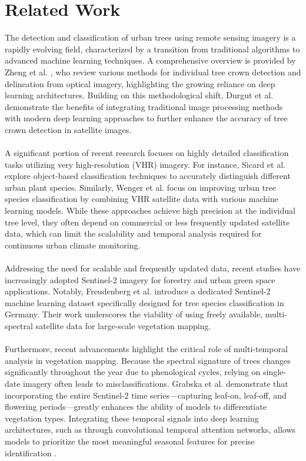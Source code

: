 \section{Related Work}

The detection and classification of urban trees using remote sensing imagery is a rapidly evolving field, characterized by a transition from traditional algorithms to advanced machine learning techniques. A comprehensive overview is provided by Zheng et al. \cite{zheng2023reviewindividualtreecrown}, who review various methods for individual tree crown detection and delineation from optical imagery, highlighting the growing reliance on deep learning architectures. Building on this methodological shift, Durgut et al. \cite{durgut2025integrating} demonstrate the benefits of integrating traditional image processing methods with modern deep learning approaches to further enhance the accuracy of tree crown detection in satellite images. \\
\\
A significant portion of recent research focuses on highly detailed classification tasks utilizing very high-resolution (VHR) imagery. For instance, Sicard et al. \cite{sicard2023object} explore object-based classification techniques to accurately distinguish different urban plant species. Similarly, Wenger et al. \cite{wenger2024improving} focus on improving urban tree species classification by combining VHR satellite data with various machine learning models. While these approaches achieve high precision at the individual tree level, they often depend on commercial or less frequently updated satellite data, which can limit the scalability and temporal analysis required for continuous urban climate monitoring.\\\
\\
Addressing the need for scalable and frequently updated data, recent studies have increasingly adopted Sentinel-2 imagery for forestry and urban green space applications. Notably, Freudenberg et al. \cite{freudenberg2025sentinel2} introduce a dedicated Sentinel-2 machine learning dataset specifically designed for tree species classification in Germany. Their work underscores the viability of using freely available, multi-spectral satellite data for large-scale vegetation mapping. \\
\\
Furthermore, recent advancements highlight the critical role of multi-temporal analysis in vegetation mapping. Because the spectral signature of trees changes significantly throughout the year due to phenological cycles, relying on single-date imagery often leads to misclassifications. Grabska et al. \cite{grabska2019forest} demonstrate that incorporating the entire Sentinel-2 time series—capturing leaf-on, leaf-off, and flowering periods—greatly enhances the ability of models to differentiate vegetation types. Integrating these temporal signals into deep learning architectures, such as through convolutional temporal attention networks, allows models to prioritize the most meaningful seasonal features for precise identification \cite{garnot2021panoptic, grabska2019forest}. \\
